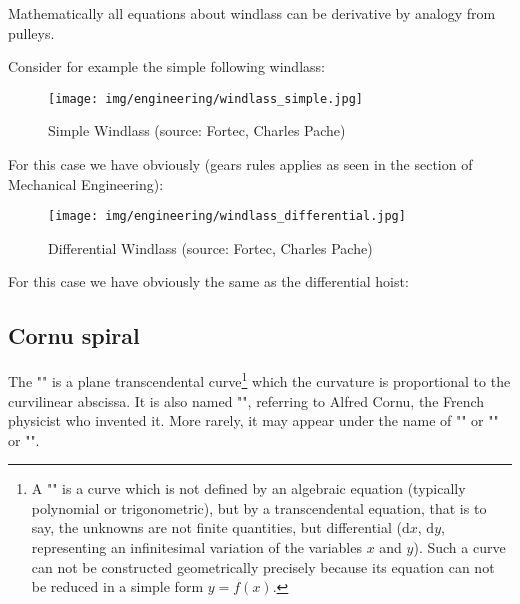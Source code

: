 	Mathematically all equations about windlass can be derivative by analogy from pulleys.
	
	Consider for example the simple following windlass:
	\begin{figure}[H]
		\centering
		\texttt{[image: img/engineering/windlass\_simple.jpg]}
		\caption{Simple Windlass (source: Fortec, Charles Pache)}
	\end{figure}
	For this case we have obviously (gears rules applies as seen in the section of Mechanical Engineering):
	
	\begin{figure}[H]
		\centering
		\texttt{[image: img/engineering/windlass\_differential.jpg]}
		\caption{Differential Windlass (source: Fortec, Charles Pache)}
	\end{figure}
	For this case we have obviously the same as the differential hoist:
	
		
	\pagebreak
	\subsection{Cornu spiral}
	The "" is a plane transcendental curve\footnote{A "" is a curve which is not defined by an algebraic equation (typically polynomial or trigonometric), but by a transcendental equation, that is to say, the unknowns are not finite quantities, but differential ($\mathrm{d}x$, $\mathrm{d}y$, representing an infinitesimal variation of the variables $x$ and $y$). Such a curve can not be constructed geometrically precisely because its equation can not be reduced in a simple form $y = f (x)$.}  which the curvature is proportional to the curvilinear abscissa. It is also named "", referring to Alfred Cornu, the French physicist who invented it. More rarely, it may appear under the name of "" or "" or "".
	
